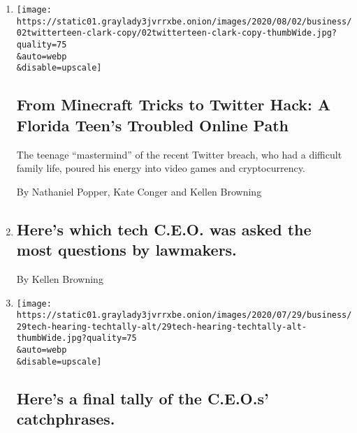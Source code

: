 \begin{enumerate}
\def\labelenumi{\arabic{enumi}.}
\item
  \href{/2020/08/02/technology/florida-teenager-twitter-hack.html}{}

  \texttt{[image: https://static01.graylady3jvrrxbe.onion/images/2020/08/02/business/02twitterteen-clark-copy/02twitterteen-clark-copy-thumbWide.jpg?quality=75\\\&auto=webp\\\&disable=upscale]}

  \hypertarget{from-minecraft-tricks-to-twitter-hack-a-florida-teens-troubled-online-path}{%
  \subsection{From Minecraft Tricks to Twitter Hack: A Florida Teen's
  Troubled Online
  Path}\label{from-minecraft-tricks-to-twitter-hack-a-florida-teens-troubled-online-path}}

  The teenage ``mastermind'' of the recent Twitter breach, who had a
  difficult family life, poured his energy into video games and
  cryptocurrency.

  By Nathaniel Popper, Kate Conger and Kellen Browning
\item
  \href{/live/2020/07/29/technology/tech-ceos-hearing-testimony/heres-which-tech-ceo-was-asked-the-most-questions-by-lawmakers}{}

  \hypertarget{heres-which-tech-ceo-was-asked-the-most-questions-by-lawmakers}{%
  \subsection{Here's which tech C.E.O. was asked the most questions by
  lawmakers.}\label{heres-which-tech-ceo-was-asked-the-most-questions-by-lawmakers}}

  By Kellen Browning
\item
  \href{/live/2020/07/29/technology/tech-ceos-hearing-testimony/what-ceos-said}{}

  \texttt{[image: https://static01.graylady3jvrrxbe.onion/images/2020/07/29/business/29tech-hearing-techtally-alt/29tech-hearing-techtally-alt-thumbWide.jpg?quality=75\\\&auto=webp\\\&disable=upscale]}

  \hypertarget{heres-a-final-tally-of-the-ceos-catchphrases}{%
  \subsection{Here's a final tally of the C.E.O.s'
  catchphrases.}\label{heres-a-final-tally-of-the-ceos-catchphrases}}


\end{enumerate}
